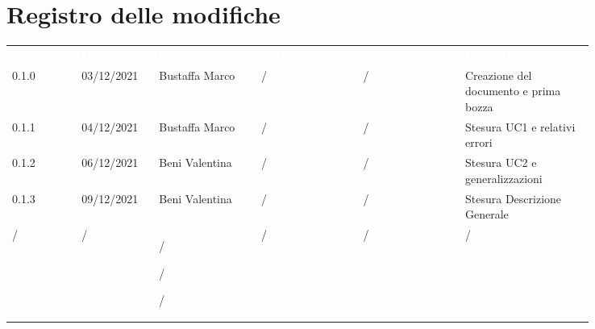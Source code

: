 \section*{Registro delle modifiche}

{\renewcommand{\arraystretch}{1.5}
\scriptsize
\begin{tabular}{p{0.10\linewidth}p{0.10\linewidth}p{0.15\linewidth}p{0.15\linewidth}p{0.15\linewidth}p{0.19\linewidth}}
	\rowcolor[RGB]{33, 73, 50}
	\textcolor{white}{\textbf{Versione}} & \textcolor{white}{\textbf{Data}} & \textcolor{white}
	{\textbf{Redattore}} & \textcolor{white}{\textbf{Verificatore}} & \textcolor{white}{\textbf{Approvatore}} & \textcolor{white}
	{\textbf{Descrizione}}\\
	\rowcolor[RGB]{216, 235, 171}
	0.1.0 & 03/12/2021 & Bustaffa Marco & / &/& Creazione del documento e prima bozza\\
	\rowcolor[RGB]{233, 245, 206}
	0.1.1 & 04/12/2021 & Bustaffa Marco& / &/& Stesura UC1 e relativi errori\\
	\rowcolor[RGB]{216, 235, 171}
	0.1.2 & 06/12/2021 & Beni Valentina& / &/& Stesura UC2 e generalizzazioni\\
	\rowcolor[RGB]{233, 245, 206}
	0.1.3 & 09/12/2021 & Beni Valentina& / &/& Stesura Descrizione Generale\\
	\rowcolor[RGB]{216, 235, 171}
	/ & / & / \par  /  \par / &/&/& /\\
\end{tabular}	
}